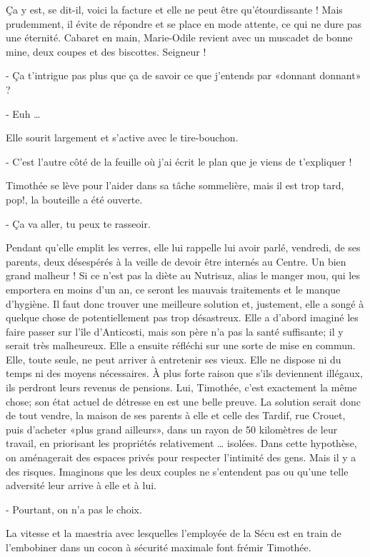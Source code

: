 Ça y est, se dit-il, voici la facture et elle ne peut être qu’étourdissante ! Mais prudemment, il évite de répondre et se place en mode attente, ce qui ne dure pas une éternité. Cabaret en main, Marie-Odile revient avec un muscadet de bonne mine, deux coupes et des biscottes. Seigneur !

- Ça t’intrigue pas plus que ça de savoir ce que j’entends par «donnant donnant» ?

- Euh …

Elle sourit largement et s’active avec le tire-bouchon.

- C’est l’autre côté de la feuille où j’ai écrit le plan que je viens de t’expliquer !

Timothée se lève pour l’aider dans sa tâche sommelière, mais il est trop tard, pop!, la bouteille a été ouverte.

- Ça va aller, tu peux te rasseoir.

Pendant qu’elle emplit les verres, elle lui rappelle lui avoir parlé, vendredi, de ses parents, deux désespérés à la veille de devoir être internés au Centre. Un bien grand malheur ! Si ce n’est pas la diète au Nutrisuz, alias le manger mou, qui les emportera en moins d’un an, ce seront les mauvais traitements et le manque d’hygiène. Il faut donc trouver une meilleure solution et, justement, elle a songé à quelque chose de potentiellement pas trop désastreux. Elle a d’abord imaginé les faire passer sur l’île d’Anticosti, mais son père n’a pas la santé suffisante; il y serait très malheureux. Elle a ensuite réfléchi sur une sorte de mise en commun. Elle, toute seule, ne peut arriver à entretenir ses vieux. Elle ne dispose ni du temps ni des moyens nécessaires. À plus forte raison que s’ils deviennent illégaux, ils perdront leurs revenus de pensions. Lui, Timothée, c’est exactement la même chose; son état actuel de détresse en est une belle preuve. La solution serait donc de tout vendre, la maison de ses parents à elle et celle des Tardif, rue Crouet, puis d’acheter «plus grand ailleurs», dans un rayon de 50 kilomètres de leur travail, en priorisant les propriétés relativement … isolées. Dans cette hypothèse, on aménagerait des espaces privés pour respecter l’intimité des gens. Mais il y a des risques. Imaginons que les deux couples ne s’entendent pas ou qu’une telle adversité leur arrive à elle et à lui.

- Pourtant, on n’a pas le choix.

La vitesse et la maestria avec lesquelles l’employée de la Sécu est en train de l’embobiner dans un cocon à sécurité maximale font frémir Timothée.

